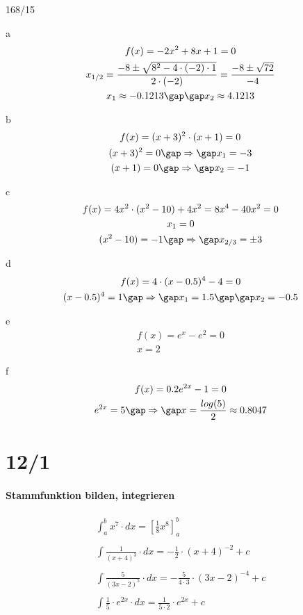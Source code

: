 \begin{exercise}{168/15}
  \item [a]
  \begin{gather*}
    f(x) = -2x^2 + 8x + 1 = 0 \\
    x_{1/2} = \frac{-8 \pm \sqrt{8^2 - 4 \cdot (-2) \cdot 1}}{2 \cdot (-2)} = \frac{-8 \pm \sqrt{72}}{-4} \\
    x_1 \approx -0.1213 \gap\gap x_2 \approx 4.1213
  \end{gather*}
  \item [b]
  \begin{gather*}
    f(x) = (x + 3)^2 \cdot (x + 1) = 0 \\
    (x + 3)^2 = 0 \gap\Rightarrow\gap x_1 = -3 \\
    (x + 1) = 0 \gap\Rightarrow\gap x_2 = -1
  \end{gather*}
  \item [c]
  \begin{gather*}
    f(x) = 4x^2 \cdot (x^2 - 10) + 4x^2 = 8x^4 - 40x^2 = 0 \\
    x_1 = 0 \\
    (x^2 - 10) = -1 \gap\Rightarrow\gap x_{2/3} = \pm 3
  \end{gather*}
  \item [d]
  \begin{gather*}
    f(x) = 4 \cdot (x - 0.5)^4 - 4 = 0 \\
    (x - 0.5)^4 = 1 \gap\Rightarrow\gap x_1 = 1.5 \gap\gap x_2 = -0.5
  \end{gather*}
  \item [e]
  \begin{gather*}
    f(x) = e^x - e^2 = 0 \\
    x = 2
  \end{gather*}
  \item [f]
  \begin{gather*}
    f(x) = 0.2e^{2x} - 1 = 0 \\
    e^{2x} = 5 \gap\Rightarrow\gap x = \frac{log(5)}{2} \approx 0.8047
  \end{gather*}
\end{exercise}

\part{12/1}

\subsection{Stammfunktion bilden, integrieren}
\begin{gather*}
  \int_a^b x^7 \cdot dx = \left[\frac{1}{8}x^8\right]_a^b \\\\
  \int \frac{1}{(x + 4)^3} \cdot dx = -\frac{1}{2} \cdot (x + 4)^{-2} + c \\\\
  \int \frac{5}{(3x - 2)^5} \cdot dx = -\frac{5}{4 \cdot 3} \cdot (3x - 2)^{-4} + c \\\\
  \int \frac{1}{5} \cdot e^{2x} \cdot dx = \frac{1}{5 \cdot 2} \cdot e^{2x} + c
\end{gather*}
